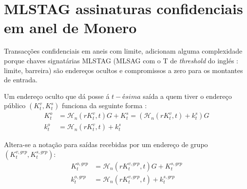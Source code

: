 


\section{MLSTAG assinaturas confidenciais em anel de Monero}
\label{sec:MLSTAG-RingCT}

Transacções confidenciais em aneis com limite, adicionam alguma complexidade porque chaves signatárias MLSTAG (MLSAG com o T de {\em threshold} do inglés : limite, barreira) são endereços ocultos e compromissos a zero para os montantes de entrada.
 

Um endereço oculto que dá posse á $t-ésima$ saída a quem tiver o endereço público $(K^v_t,K^s_t)$ funciona da seguinte forma :
\begin{align*}
  K_t^o &= \mathcal{H}_n(r K_t^v, t)G + K_t^s = (\mathcal{H}_n(r K_t^v, t) + k_t^s)G  \\ 
  k_t^o &= \mathcal{H}_n(r K_t^v, t) + k_t^s
\end{align*} 

Altera-se a notação para saídas recebidas por um endereço de grupo $(K^{v,grp}_t,K^{s,grp}_t)$:
\begin{align*}
  K^{o,grp}_t &= \mathcal{H}_n(r K^{v,grp}_t, t)G + K^{s,grp}_t  \\ 
  k^{o,grp}_t &= \mathcal{H}_n(r K^{v,grp}_t, t) + k^{s,grp}_t
\end{align*}

